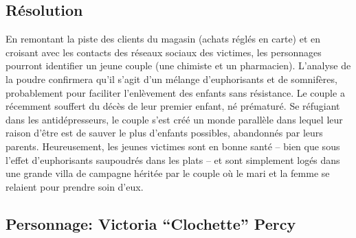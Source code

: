 \subsection{Résolution}

En remontant la piste des clients du magasin (achats réglés en carte) et en croisant avec les contacts des réseaux sociaux des victimes, les personnages pourront identifier un jeune couple (une chimiste et un pharmacien).
L'analyse de la poudre confirmera qu'il s'agit d'un mélange d'euphorisants et de somnifères, probablement pour faciliter l'enlèvement des enfants sans résistance.
Le couple a récemment souffert du décès de leur premier enfant, né prématuré.
Se réfugiant dans les antidépresseurs, le couple s'est créé un monde parallèle dans lequel leur raison d'être est de sauver le plus d'enfants possibles, \og abandonnés \fg par leurs parents.
Heureusement, les jeunes victimes sont en bonne santé -- bien que sous l'effet d'euphorisants saupoudrés dans les plats -- et sont simplement logés dans une grande villa de campagne héritée par le couple où le mari et la femme se relaient pour prendre soin d'eux.

\subsection{Personnage: Victoria ``Clochette'' Percy}

\vfill
{}
\vfill

